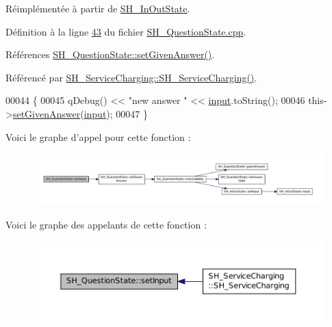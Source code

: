 Réimplémentée à partir de \hyperlink{classSH__InOutState_a0206ab7d5616f28b0da7bfd5451614e8}{S\-H\-\_\-\-In\-Out\-State}.



Définition à la ligne \hyperlink{SH__QuestionState_8cpp_source_l00043}{43} du fichier \hyperlink{SH__QuestionState_8cpp_source}{S\-H\-\_\-\-Question\-State.\-cpp}.



Références \hyperlink{classSH__QuestionState_a9d285a34a7002fd05a7fa8ff9139c264}{S\-H\-\_\-\-Question\-State\-::set\-Given\-Answer()}.



Référencé par \hyperlink{classSH__ServiceCharging_afa5273d046049b1c2b020a6a19a8290b}{S\-H\-\_\-\-Service\-Charging\-::\-S\-H\-\_\-\-Service\-Charging()}.


\begin{DoxyCode}
00044 \{
00045     qDebug() << \textcolor{stringliteral}{"new answer "} << \hyperlink{classSH__InOutState_a04364c76d2fd8a3781e7b325955e5bd9}{input}.toString();
00046     this->\hyperlink{classSH__QuestionState_a9d285a34a7002fd05a7fa8ff9139c264}{setGivenAnswer}(\hyperlink{classSH__InOutState_a04364c76d2fd8a3781e7b325955e5bd9}{input});
00047 \}
\end{DoxyCode}


Voici le graphe d'appel pour cette fonction \-:\nopagebreak
\begin{figure}[H]
\begin{center}
\leavevmode
\includegraphics[width=350pt]{classSH__QuestionState_a331222d371d9c97392f35c84a5ef43e1_cgraph}
\end{center}
\end{figure}




Voici le graphe des appelants de cette fonction \-:\nopagebreak
\begin{figure}[H]
\begin{center}
\leavevmode
\includegraphics[width=350pt]{classSH__QuestionState_a331222d371d9c97392f35c84a5ef43e1_icgraph}
\end{center}
\end{figure}


